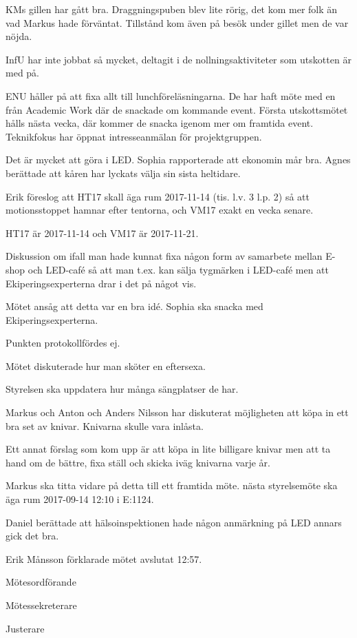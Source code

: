 \documentclass[10pt]{article}
\def\mo{Erik Månsson}
\def\ms{Johan Karlberg}
\def\ji{Edvard Carlsson}
\begin{document}
\begin{paragrafer}
\begin{paragrafer}
KMs gillen har gått bra. Draggningspuben blev lite rörig, det kom mer folk än vad Markus hade förväntat. Tillstånd kom även på besök under gillet men de var nöjda.

InfU har inte jobbat så mycket, deltagit i de nollningsaktiviteter som utskotten är med på.

ENU håller på att fixa allt till lunchföreläsningarna. De har haft möte med en från Academic Work där de snackade om kommande event. Första utskottsmötet hålls nästa vecka, där kommer de snacka igenom mer om framtida event. Teknikfokus har öppnat intresseanmälan för projektgruppen.

Det är mycket att göra i LED.
Sophia rapporterade att ekonomin mår bra.
Agnes berättade att kåren har lyckats välja sin sista heltidare.
\end{paragrafer}

Erik föreslog att HT17 skall äga rum 2017-11-14 (tis. l.v. 3 l.p. 2) så att motionsstoppet hamnar efter tentorna, och VM17 exakt en vecka senare.

\Mba HT17 är 2017-11-14 och VM17 är 2017-11-21.

Diskussion om ifall man hade kunnat fixa någon form av samarbete mellan E-shop och LED-café så att man t.ex. kan sälja tygmärken i LED-café men att Ekiperingsexperterna drar i det på något vis.

Mötet ansåg att detta var en bra idé. Sophia ska snacka med Ekiperingsexperterna.

Punkten protokollfördes ej.

Mötet diskuterade hur man sköter en eftersexa.

Styrelsen ska uppdatera hur många sängplatser de har.

Markus och Anton och Anders Nilsson har diskuterat möjligheten att köpa in ett bra set av knivar. Knivarna skulle vara inlåsta.

Ett annat förslag som kom upp är att köpa in lite billigare knivar men att ta hand om de bättre, fixa ställ och skicka iväg knivarna varje år.

Markus ska titta vidare på detta till ett framtida möte.
{\Mba}nästa styrelsemöte ska äga rum 2017-09-14 12:10 i E:1124.

{\Ibfu}

Daniel berättade att hälsoinspektionen hade någon anmärkning på LED annars gick det bra.

{\mo} förklarade mötet avslutat 12:57.

\end{paragrafer}

\hidesignfoot
\begin{signatures}{3}
\signature{\mo}{Mötesordförande}
\signature{\ms}{Mötessekreterare}
\signature{\ji}{Justerare}
\end{signatures}
\end{document}
